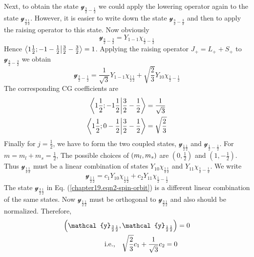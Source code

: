 Next, to obtain the state $\mathcal{y}_{\frac{3}{2}-\frac{1}{2}}$ we could apply the lowering operator again to the state $\mathcal{y}_{\frac{3}{2}\frac{1}{2}}$. However, it is easier to write down the state $\mathcal{y}_{\frac{3}{2}-\frac{3}{2}}$ and then to apply the raising operator to this state. Now obviously
\begin{equation}
\label{chapter19.eqn3-spin-orbit}
\mathcal{y}_{\frac{3}{2}-\frac{3}{2}} = Y_{1 -1}\chi_{\frac{1}{2}-\frac{1}{2}}
\end{equation}
Hence $\braket{1 \frac{1}{2}; -1 -\frac{1}{2}}{\frac{3}{2}-\frac{3}{2}} = 1$. Applying the raising operator $J_{+} = L_{+} + S_{+}$ to $\mathcal{y}_{\frac{3}{2}-\frac{3}{2}}$ we obtain
\begin{equation}
\label{chapter19.eqn4-spin-orbit}
\mathcal{y}_{\frac{3}{2}-\frac{1}{2}} = \frac{1}{\sqrt{3}} Y_{1 -1} \chi_{\frac{1}{2}\frac{1}{2}} + \sqrt{\frac{2}{3}} Y_{1 0}\chi_{\frac{1}{2}-\frac{1}{2}}
\end{equation}
The corresponding CG coefficients are
\begin{align*}
\braket{1 \frac{1}{2};-1\frac{1}{2}}{\frac{3}{2}-\frac{1}{2}} &= \frac{1}{\sqrt{3}} \\
\braket{1\frac{1}{2};0-\frac{1}{2}}{\frac{3}{2}-\frac{1}{2}} &= \sqrt{\frac{2}{3}}
\end{align*}
Finally for $j=\frac{1}{2}$, we have to form the two coupled states, $\mathcal{y}_{\frac{1}{2}\frac{1}{2}}$ and $\mathcal{y}_{\frac{1}{2}-\frac{1}{2}}$. For $m=m_l + m_s = \frac{1}{2}$, The possible choices of $\qty(m_l, m_s)$ are $(0,\frac{1}{2})$ and $(1,-\frac{1}{2})$. Thus $\mathcal{y}_{\frac{1}{2}\frac{1}{2}}$ must be a linear combination of states $Y_{1 0}\chi_{\frac{1}{2}\frac{1}{2}}$ and $Y_{1 1}\chi_{\frac{1}{2}-\frac{1}{2}}$. We write
\begin{equation}
\mathcal{y}_{\frac{1}{2}\frac{1}{2}} = c_1 Y_{1 0}\chi_{\frac{1}{2}\frac{1}{2}} + c_2 Y_{1 1}\chi_{\frac{1}{2}-\frac{1}{2}}
\end{equation}
The state $\mathcal{y}_{\frac{3}{2}\frac{1}{2}}$ in Eq. (\ref{chapter19.eqn2-spin-orbit}) is a different linear combination of the same states. Now $\mathcal{y}_{\frac{1}{2}\frac{1}{2}}$ must be orthogonal to $\mathcal{y}_{\frac{3}{2}\frac{1}{2}}$ and also should be normalized. Therefore,
\begin{align}
\qty(\mathcal{y}_{\frac{3}{2}\frac{1}{2}},\mathcal{y}_{\frac{1}{2}\frac{1}{2}}) &= 0 \nonumber\\
\label{chapter19.eqn5-spin-orbit}
\qq{i.e.,}\sqrt{\frac{2}{3}} c_1 + \frac{1}{\sqrt{3}} c_2 = 0
\end{align}
